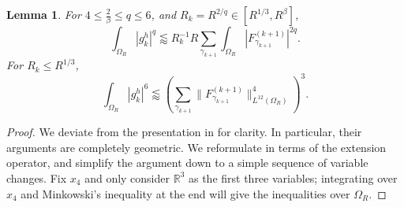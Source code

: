 \documentclass[12pt]{amsart}
\newtheorem{lemma}[theorem]{Lemma}
\providecommand{\R}{\mathbb R}
\begin{document}
\begin{lemma}\label{lem:highOrthog}
For $4\le \frac{2}{\beta}\le q\le 6$, and $R_k=R^{2/q}\in [R^{1/3}, R^{\beta}]$, 
    $$\int_{\Omega_R}|g_k^h|^{q} \lessapprox R_k^{-1}R \sum_{\gamma_{k+1}}\int_{\Omega_R} |F_{\gamma_{k+1}}^{(k+1)}|^{2q}.$$  For $R_k\le R^{1/3}$, $$\int_{\Omega_R}|g_k^h|^6\lessapprox \left(\sum_{\gamma_{k+1}}\|F_{\gamma_{k+1}}^{(k+1)}\|_{L^{12}(\Omega_R)}^4\right)^3.$$
\end{lemma}

\begin{proof}
    We deviate from the presentation in \cite[Section 2.3-2.4]{Guth_2024} for clarity. In particular, their arguments are completely geometric. We reformulate in terms of the extension operator, and simplify the argument down to a simple sequence of variable changes. Fix $x_4$ and only consider $\R^3$ as the first three variables; integrating over $x_4$ and Minkowski's inequality at the end will give the inequalities over $\Omega_R$.
    

\end{proof}
\end{document}
